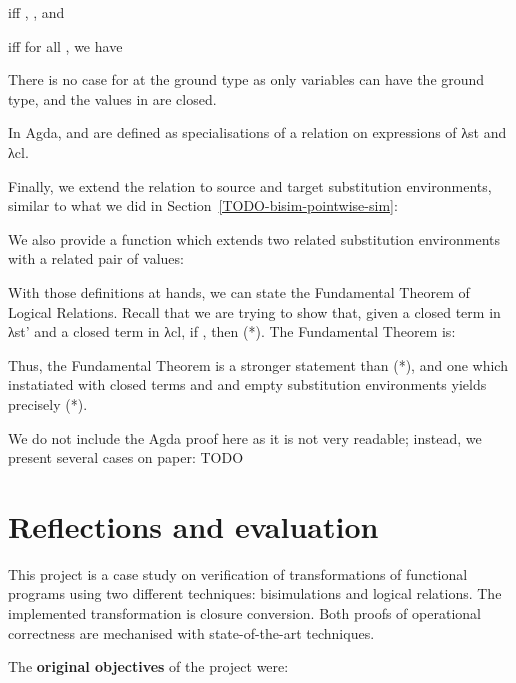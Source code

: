 \documentclass[bsc,frontabs,oneside,singlespacing,parskip,deptreport]{infthesis}
\theoremstyle{definition}
\theoremstyle{lemma}
\begin{document}
 iff , , and 

 iff for all , we have 

There is no case for  at the ground type  as only
variables can have the ground type, and the values in  are
closed.

In Agda, \AS{\ti} and  are defined as specialisations of a
relation  on expressions of λst and λcl. 


Finally, we extend the  relation to source and target
substitution environments, similar to what we did in
Section~\ref{TODO-bisim-pointwise-sim}:


We also provide a function  which extends two related
substitution environments with a related pair of values:


With those definitions at hands, we can state the Fundamental Theorem
of Logical Relations. Recall that we are trying to show that, given a
closed term  in λst' and a closed term  in λcl, if
, then  (*). The Fundamental Theorem is:


Thus, the Fundamental Theorem is a stronger statement than (*), and
one which instatiated with closed terms and and empty substitution
environments yields precisely (*).

We do not include the Agda proof here as it is not very readable;
instead, we present several cases on paper: TODO

\chapter{Reflections and evaluation}
\label{cha:refl-eval}

This project is a case study on verification of transformations of
functional programs using two different techniques: bisimulations and
logical relations. The implemented transformation is closure
conversion. Both proofs of operational correctness are mechanised with
state-of-the-art techniques.

The \textbf{original objectives} of the project were:
\end{document}
